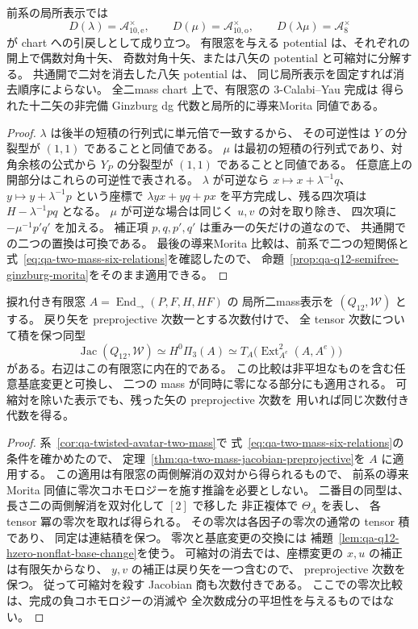 \begin{corollary}[幾何開部分と二mass消去の対応]
\label{cor:qa-avatar-two-mass-reduction-opens}
前系の局所表示では
\[
 D(\lambda)=\mathcal A_{10,\mathrm e}^{\times},\qquad
 D(\mu)=\mathcal A_{10,\mathrm o}^{\times},\qquad
 D(\lambda\mu)=\mathcal A_8^{\times}
\]
が chart への引戻しとして成り立つ。
有限窓を与える potential は、それぞれの開上で偶数対角十矢、
奇数対角十矢、または八矢の potential と可縮対に分解する。
共通開で二対を消去した八矢 potential は、
同じ局所表示を固定すれば消去順序によらない。
全二mass chart 上で、有限窓の $3$-Calabi--Yau 完成は
得られた十二矢の非完備 Ginzburg dg 代数と局所的に導来Morita 同値である。
\end{corollary}
\begin{proof}
$\lambda$ は後半の短積の行列式に単元倍で一致するから、
その可逆性は $Y$ の分裂型が $(1,1)$ であることと同値である。
$\mu$ は最初の短積の行列式であり、対角余核の公式から
$Y_P$ の分裂型が $(1,1)$ であることと同値である。
任意底上の開部分はこれらの可逆性で表される。
$\lambda$ が可逆なら $x\mapsto x+\lambda^{-1}q$、
$y\mapsto y+\lambda^{-1}p$ という座標で
$\lambda yx+yq+px$ を平方完成し、残る四次項は
$H-\lambda^{-1}pq$ となる。
$\mu$ が可逆な場合は同じく $u,v$ の対を取り除き、
四次項に $-\mu^{-1}p'q'$ を加える。
補正項 $p,q,p',q'$ は重み一の矢だけの道なので、
共通開での二つの置換は可換である。
最後の導来Morita 比較は、前系で二つの短関係と
式~\eqref{eq:qa-two-mass-six-relations}を確認したので、
命題~\ref{prop:qa-q12-semifree-ginzburg-morita}をそのまま適用できる。
\end{proof}

\begin{corollary}
\label{cor:qa-avatar-twisted-ordinary-jacobian}
捩れ付き有限窓 $A=\operatorname{End}_{\to}(P,F,H,HF)$ の
局所二mass表示を $(Q_{12},\mathcal W)$ とする。
戻り矢を preprojective 次数一とする次数付けで、
全 tensor 次数について積を保つ同型
\[
 \operatorname{Jac}(Q_{12},\mathcal W)
     \simeq H^0\Pi_3(A)
     \simeq T_A\bigl(\operatorname{Ext}^2_{A^e}(A,A^e)\bigr)
\]
がある。右辺はこの有限窓に内在的である。
この比較は非平坦なものを含む任意基底変更と可換し、
二つの mass が同時に零になる部分にも適用される。
可縮対を除いた表示でも、残った矢の preprojective 次数を
用いれば同じ次数付き代数を得る。
\end{corollary}
\begin{proof}
系~\ref{cor:qa-twisted-avatar-two-mass}で
式~\eqref{eq:qa-two-mass-six-relations}の条件を確かめたので、
定理~\ref{thm:qa-two-mass-jacobian-preprojective}を $A$ に適用する。
この適用は有限窓の両側解消の双対から得られるもので、
前系の導来Morita 同値に零次コホモロジーを施す推論を必要としない。
二番目の同型は、長さ二の両側解消を双対化して $[2]$ で移した
非正複体で $\Theta_A$ を表し、
各 tensor 冪の零次を取れば得られる。
その零次は各因子の零次の通常の tensor 積であり、
同定は連結積を保つ。
零次と基底変更の交換には
補題~\ref{lem:qa-q12-hzero-nonflat-base-change}を使う。
可縮対の消去では、座標変更の $x,u$ の補正は有限矢からなり、
$y,v$ の補正は戻り矢を一つ含むので、
preprojective 次数を保つ。
従って可縮対を殺す Jacobian 商も次数付きである。
ここでの零次比較は、完成の負コホモロジーの消滅や
全次数成分の平坦性を与えるものではない。
\end{proof}

